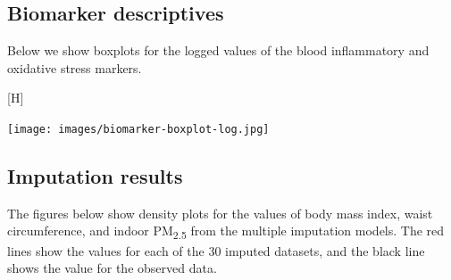 \documentclass[
  letterpaper,
  DIV=11,
  numbers=noendperiod]{scrartcl}
\makeatletter
\renewenvironment{figure}%
   {\renewcommand\familydefault\sfdefault
    \@float{figure}}
   {\end@float}
\makeatother
\begin{document}
\hypertarget{biomarker-descriptives}{%
\subsection{Biomarker descriptives}\label{biomarker-descriptives}}

Below we show boxplots for the logged values of the blood inflammatory
and oxidative stress markers.

\begin{figure}[H]

{\centering \texttt{[image: images/biomarker-boxplot-log.jpg]}

}

\caption{\label{fig-afig-biomarkers}Boxplots for markers of systemic
inflammation including C-reactive protein (CRP), interleukin-6 (IL-6),
tumour necrosis factor alpha (TNF-\(\alpha\)) and markers of oxidative
stress including 8-hydroxy-2'-deoxyguanosine (8-OHdG) and
malondialdehyde (MDA)}

\end{figure}

\newpage

\hypertarget{imputation-results}{%
\subsection{Imputation results}\label{imputation-results}}

The figures below show density plots for the values of body mass index,
waist circumference, and indoor PM\textsubscript{2.5} from the multiple
imputation models. The red lines show the values for each of the 30
imputed datasets, and the black line shows the value for the observed
data.
\end{document}
